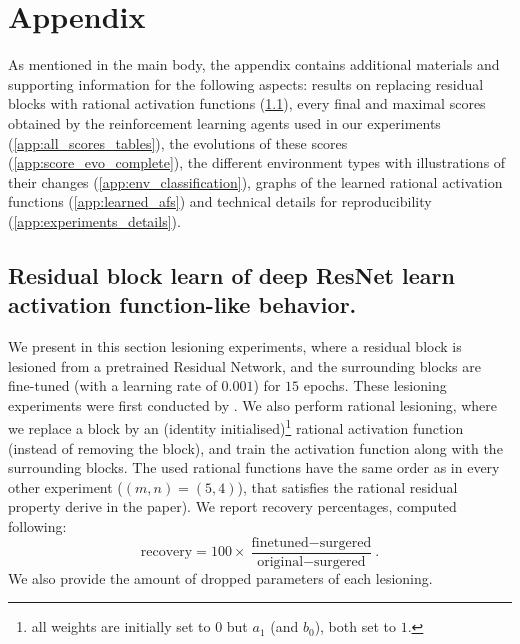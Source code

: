 \documentclass[accepted]{article}
\theoremstyle{plain}
\theoremstyle{definition}
\theoremstyle{remark}
\begin{document}
\section{Appendix}

As mentioned in the main body, the appendix contains additional materials and supporting information for the following aspects: results on replacing residual blocks with rational activation functions (\ref{sec:res_exp}), every final and maximal scores obtained by the reinforcement learning agents used in our experiments (\ref{app:all_scores_tables}), the evolutions of these scores (\ref{app:score_evo_complete}), the different environment types with illustrations of their changes (\ref{app:env_classification}), graphs of the learned rational activation functions (\ref{app:learned_afs}) and technical details for reproducibility (\ref{app:experiments_details}).

\subsection{Residual block learn of deep ResNet learn activation function-like behavior.}
\label{sec:res_exp}
We present in this section lesioning experiments, where a residual block is lesioned from a pretrained Residual Network, and the surrounding blocks are fine-tuned (with a learning rate of $0.001$) for $15$ epochs. These lesioning experiments were first conducted by \citeauthor{VeitWB16} . We also perform rational lesioning, where we replace a block by an (identity initialised)\footnote{all weights are initially set to $0$ but $a_1$ (and $b_0$), both set to $1$.} rational activation function (instead of removing the block), and train the activation function along with the surrounding blocks. The used rational functions have the same order as in every other experiment ($(m,n)=(5,4)$), that satisfies the rational residual property derive in the paper). We report recovery percentages, computed following:
\begin{equation}
  \text{recovery}= 100 \times \frac{\text{finetuned} - \text{surgered}}{\text{original} - \text{surgered}}.
  \label{eq:recovery}
\end{equation}
We also provide the amount of dropped parameters of each lesioning.
\end{document}
